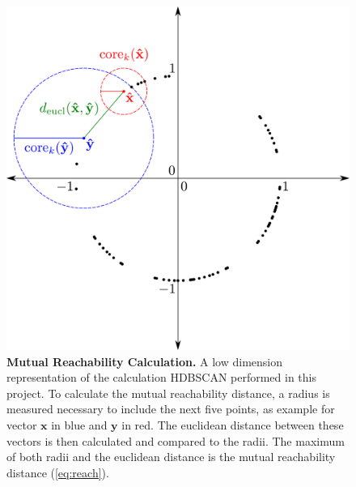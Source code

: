 
\begin{figure}[!hbt]
    \centering
    \includegraphics[width=\textwidth]{Graphics/HDB.pdf}
    \caption[Mutual Reachability Calculation]{\textbf{Mutual Reachability Calculation.} A low dimension representation of the calculation \gls{HDBSCAN} performed in this project. To calculate the mutual reachability distance, a radius is measured necessary to include the next five points, as example for vector $\mathbf{x}$ in blue and $\mathbf{y}$ in red. The euclidean distance between these vectors is then calculated and compared to the radii. The maximum of both radii and the euclidean distance is the mutual reachability distance (\autoref{eq:reach}).}
    \label{fig:HDB}
\end{figure}


